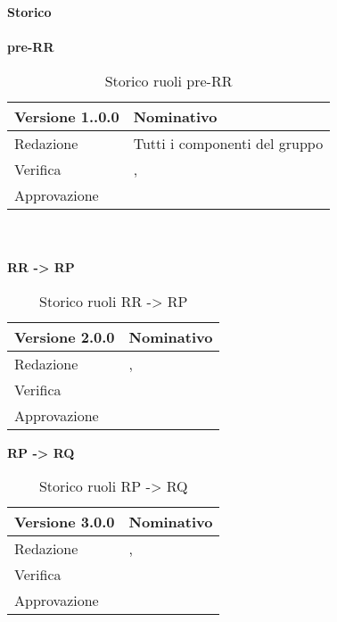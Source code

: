 \newpage
\Large{\textbf{Storico }}\\
\normalsize \\

\noindent \textbf{pre-RR}
\label{tabVers1}
\begin{table}[h]
	\begin{tabular}{p{} p{}}
		\toprule \textbf{Versione 1..0.0}	&	\textbf{Nominativo}\\
		\midrule Redazione	& Tutti i componenti del gruppo\\
		\midrule Verifica & \PM, \BM\\
		\midrule Approvazione	& \TP\\
		\bottomrule
	\end{tabular}
	\caption{Storico ruoli pre-RR}
\end{table}
\\
\normalsize \\
\noindent \textbf{RR -> RP}
\label{tabVers2}
\begin{table}[h]
	\begin{tabular}{p{} p{}}
		\toprule \textbf{Versione 2.0.0}	&	\textbf{Nominativo}\\
		\midrule Redazione	& \FM, \BM\\
		\midrule Verifica & \GP\\
		\midrule Approvazione	& \VG\\
		\bottomrule
	\end{tabular}
	\caption{Storico ruoli RR -> RP}
\end{table}

\noindent \textbf{RP -> RQ}
\label{tabVers3}
\begin{table}[h]
	\begin{tabular}{p{} p{}}
		\toprule \textbf{Versione 3.0.0}	&	\textbf{Nominativo}\\
		\midrule Redazione	& \FM, \BM\\
		\midrule Verifica & \GP\\
		\midrule Approvazione	& \VG\\
		\bottomrule
	\end{tabular}
	\caption{Storico ruoli RP -> RQ}
\end{table}